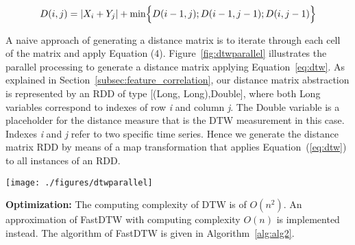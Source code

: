 \begin{equation}\label{eq:dtw}
D(i,j) = | X_i + Y_j |  + \min \Bigl\{ D(i-1,j); D(i-1,j-1); 
D(i,j-1) \Bigr\} 
\end{equation}

A naive approach of generating a distance matrix is to iterate through each cell of the matrix and apply Equation (4). Figure~\ref{fig:dtwparallel} illustrates the parallel processing to generate a distance matrix applying Equation~\ref{eq:dtw}. As explained in Section~\ref{subsec:feature_correlation}, our distance matrix abstraction is represented by an RDD of type \textsf{[(Long, Long),Double]}, where both \textsf{Long} variables correspond to indexes of row \textit{i} and column \textit{j}. The \textsf{Double} variable is a placeholder for the distance measure that is the DTW measurement in this case. Indexes \textit{i} and \textit{j} refer to two specific time series.  Hence we generate the distance matrix RDD by means of a \textsf{map} transformation that applies Equation~(\ref{eq:dtw}) to all instances of an RDD.

\begin{figure*}
	\texttt{[image: ./figures/dtwparallel]}
	{\caption{The DTW Distance Matrix Computation in Spark. A mapping transformation calculating the DTW algorithm is applied to a an RDD of indexes. Each of these indexes correspond to vectors of values which defines the timeserie.}
		\label{fig:dtwparallel}}
\end{figure*} 


\textbf{Optimization:} The computing complexity of DTW is of $O(n^2)$. An approximation of FastDTW \cite{salvador2007} with computing complexity $O(n)$ is implemented instead. The algorithm of FastDTW is given in Algorithm~\ref{alg:alg2}.

